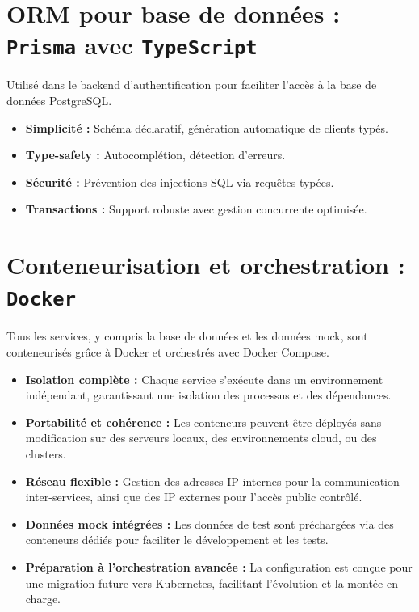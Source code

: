 \documentclass{rapportPfe}
\begin{document}
\section{ORM pour base de données : \texttt{Prisma} avec \texttt{TypeScript}}

Utilisé dans le backend d’authentification pour faciliter l’accès à la base de données PostgreSQL.

\begin{itemize}
    \item \textbf{Simplicité :} Schéma déclaratif, génération automatique de clients typés.
    \item \textbf{Type-safety :} Autocomplétion, détection d’erreurs.
    \item \textbf{Sécurité :} Prévention des injections SQL via requêtes typées.
    \item \textbf{Transactions :} Support robuste avec gestion concurrente optimisée.
\end{itemize}

\section{Conteneurisation et orchestration : \texttt{Docker}}

Tous les services, y compris la base de données et les données mock, sont conteneurisés grâce à Docker et orchestrés avec Docker Compose.

\begin{itemize}
    \item \textbf{Isolation complète :} Chaque service s’exécute dans un environnement indépendant, garantissant une isolation des processus et des dépendances.
    \item \textbf{Portabilité et cohérence :} Les conteneurs peuvent être déployés sans modification sur des serveurs locaux, des environnements cloud, ou des clusters.
    \item \textbf{Réseau flexible :} Gestion des adresses IP internes pour la communication inter-services, ainsi que des IP externes pour l’accès public contrôlé.
    \item \textbf{Données mock intégrées :} Les données de test sont préchargées via des conteneurs dédiés pour faciliter le développement et les tests.
    \item \textbf{Préparation à l’orchestration avancée :} La configuration est conçue pour une migration future vers Kubernetes, facilitant l’évolution et la montée en charge.
\end{itemize}
\end{document}
